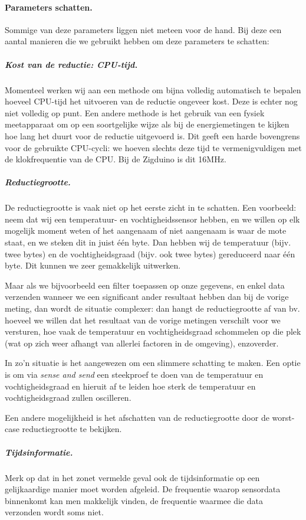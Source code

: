 \documentclass{article}
\begin{document}
\paragraph{Parameters schatten.} Sommige van deze parameters liggen niet meteen
voor de hand. Bij deze een aantal manieren die we gebruikt hebben om deze
parameters te schatten:

\subparagraph{Kost van de reductie: CPU-tijd.} Momenteel werken wij aan een
methode om bijna volledig automatisch te bepalen hoeveel CPU-tijd het uitvoeren
van de reductie ongeveer kost. Deze is echter nog niet volledig op punt. Een
andere methode is het gebruik van een fysiek meetapparaat om op een soortgelijke
wijze als bij de energiemetingen te kijken hoe lang het duurt voor de reductie
uitgevoerd is. Dit geeft een harde bovengrens voor de gebruikte CPU-cycli: we
hoeven slechts deze tijd te vermenigvuldigen met de klokfrequentie van de
CPU. Bij de Zigduino is dit 16MHz.

\subparagraph{Reductiegrootte.} De reductiegrootte is vaak
niet op het eerste zicht in te schatten. Een voorbeeld: neem dat wij een
temperatuur- en vochtigheidssensor hebben, en we willen op elk mogelijk moment
weten of het aangenaam of niet aangenaam is waar de mote staat, en we steken dit
in juist één byte. Dan hebben wij de temperatuur (bijv. twee bytes) en de
vochtigheidsgraad (bijv. ook twee bytes) gereduceerd naar \'e\'en byte. Dit
kunnen we zeer gemakkelijk uitwerken.

Maar als we bijvoorbeeld een filter toepassen op onze gegevens, en enkel data
verzenden wanneer we een significant ander resultaat hebben dan bij de vorige
meting, dan wordt de situatie complexer: dan hangt de reductiegrootte af van
bv. hoeveel we willen dat het resultaat van de vorige metingen verschilt voor we
versturen, hoe vaak de temperatuur en vochtigheidsgraad schommelen op die plek
(wat op zich weer afhangt van allerlei factoren in de omgeving), enzoverder.

In zo'n situatie is het aangewezen om een slimmere schatting te maken. Een optie
is om via \textit{sense and send} een steekproef te doen van de temperatuur en
vochtigheidsgraad en hieruit af te leiden hoe sterk de temperatuur en
vochtigheidsgraad zullen oscilleren.

Een andere mogelijkheid is het afschatten van de reductiegrootte door de
worst-case reductiegrootte te bekijken.

\subparagraph{Tijdsinformatie.} Merk op dat in het zonet vermelde geval ook de
tijdsinformatie op een gelijkaardige manier moet worden afgeleid. De frequentie
waarop sensordata binnenkomt kan men makkelijk vinden, de frequentie waarmee die
data verzonden wordt soms niet. 
\end{document}
